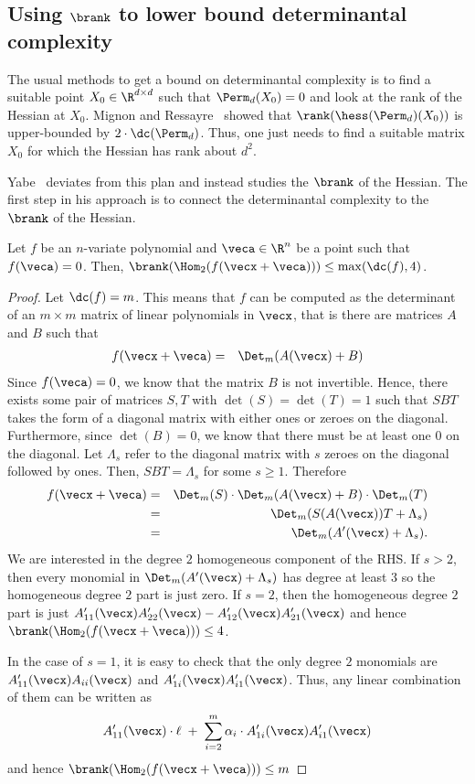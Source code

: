 \subsection{Using $\brank$ to lower bound determinantal complexity}

The usual methods to get a bound on determinantal complexity is to find a suitable point $X_0 \in \R^{d\times d}$ such that $\Perm_d(X_0) = 0$ and look at the rank of the Hessian at $X_0$. Mignon and Ressayre~\cite{mr04} showed that $\rank(\hess(\Perm_d)(X_0))$ is upper-bounded by $2\cdot \dc(\Perm_d)$. Thus, one just needs to find a suitable matrix $X_0$ for which the Hessian has rank about $d^2$. 

Yabe~\cite{Yabe15} deviates from this plan and instead studies the $\brank$ of the Hessian. The first step in his approach is to connect the determinantal complexity to the $\brank$ of the Hessian. 


\begin{lemma}\label{lem:detcomplexity-to-brank} Let $f$ be an $n$-variate polynomial and $\veca \in \R^n$ be a point such that $f(\veca) = 0$. Then, $\brank(\Hom_2(f(\vecx + \veca))) \leq \max(\dc(f),4)$. 
\end{lemma}
\begin{proof}
Let $\dc(f) = m$. This means that $f$ can be computed as the determinant of an $m\times m$ matrix of linear polynomials in $\vecx$, that is there are matrices $A$ and $B$ such that  
\begin{eqnarray*}
f(\vecx + \veca) & = & \Det_m(A(\vecx) + B)
\end{eqnarray*}
Since $f(\veca) = 0$, we know that the matrix $B$ is not invertible. Hence, there exists some pair of matrices $S, T$ with $\det(S) = \det(T) = 1$ such that $S B T$ takes the form of a diagonal matrix with either ones or zeroes on the diagonal. Furthermore, since $\det(B) = 0$, we know that there must be at least one $0$ on the diagonal. Let $\Lambda_s$ refer to the diagonal matrix with $s$ zeroes on the diagonal followed by ones. Then, $S B T = \Lambda_s$ for some $s \geq 1$. Therefore 
\begin{eqnarray*}
f(\vecx + \veca) & = & \Det_m(S) \cdot \Det_m(A(\vecx) + B) \cdot \Det_m(T)\\
 & = & \Det_m( S (A(\vecx)) T + \Lambda_s)\\
 & = & \Det_m( A'(\vecx) + \Lambda_s).
\end{eqnarray*}
We are interested in the degree $2$ homogeneous component of the RHS. If $s > 2$, then every monomial in $\Det_m(A'(\vecx) + \Lambda_s)$ has degree at least $3$ so the homogeneous degree $2$ part is just zero. If $s = 2$, then the homogeneous degree $2$ part is just $A'_{11}(\vecx) A'_{22}(\vecx) - A'_{12}(\vecx) A'_{21}(\vecx)$ and hence $\brank(\Hom_2(f(\vecx + \veca)))\leq 4$. 

In the case of $s = 1$, it is easy to check that the only degree $2$ monomials are $A_{11}'(\vecx) A_{ii}(\vecx)$ and $A_{1i}'(\vecx) A_{i1}'(\vecx)$. Thus, any linear combination of them can be written as
\[
A_{11}'(\vecx) \cdot \ell  \;+\;  \sum_{i=2}^m \alpha_i \cdot A_{1i}'(\vecx)A_{i1}'(\vecx)
\]
and hence $\brank(\Hom_2(f(\vecx + \veca))) \leq m$
\end{proof}


